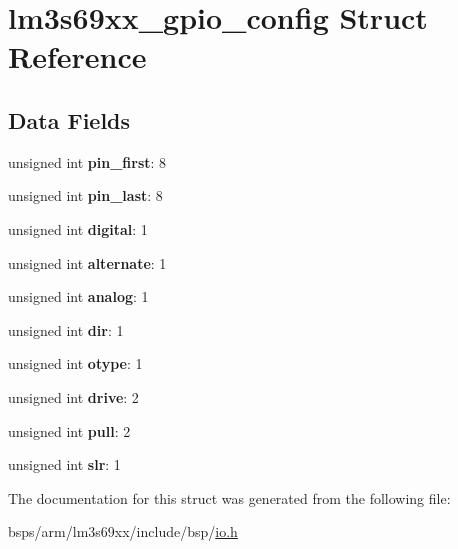 \hypertarget{structlm3s69xx__gpio__config}{}\section{lm3s69xx\+\_\+gpio\+\_\+config Struct Reference}
\label{structlm3s69xx__gpio__config}
\subsection*{Data Fields}
\begin{DoxyCompactItemize}
\item 
\mbox{\label{structlm3s69xx__gpio__config_a98771e4bac61cb4a7d56d781e24f86cb}} 
unsigned int {\bfseries pin\+\_\+first}\+: 8
\item 
\mbox{\label{structlm3s69xx__gpio__config_a06dcc57a59ce428246cb790e9d6d83dd}} 
unsigned int {\bfseries pin\+\_\+last}\+: 8
\item 
\mbox{\label{structlm3s69xx__gpio__config_aa6ac103c379f508c2f3e4422732e7377}} 
unsigned int {\bfseries digital}\+: 1
\item 
\mbox{\label{structlm3s69xx__gpio__config_a115f6aaaa24657106f63a46844c3335c}} 
unsigned int {\bfseries alternate}\+: 1
\item 
\mbox{\label{structlm3s69xx__gpio__config_a739c2908f99a9f26468d1d477e811090}} 
unsigned int {\bfseries analog}\+: 1
\item 
\mbox{\label{structlm3s69xx__gpio__config_aed62d8df8e69b0a15f5054228a2acf5b}} 
unsigned int {\bfseries dir}\+: 1
\item 
\mbox{\label{structlm3s69xx__gpio__config_a503f491a1b38d5f094bd0ba5931df52c}} 
unsigned int {\bfseries otype}\+: 1
\item 
\mbox{\label{structlm3s69xx__gpio__config_a4ce23a995b1018d499ea44f0b1d4008e}} 
unsigned int {\bfseries drive}\+: 2
\item 
\mbox{\label{structlm3s69xx__gpio__config_aad2e273c77be59cbd17e2ad2c57103f4}} 
unsigned int {\bfseries pull}\+: 2
\item 
\mbox{\label{structlm3s69xx__gpio__config_a4c59303c83352e260ec6111b322b41ea}} 
unsigned int {\bfseries slr}\+: 1
\end{DoxyCompactItemize}


The documentation for this struct was generated from the following file\+:\begin{DoxyCompactItemize}
\item 
bsps/arm/lm3s69xx/include/bsp/\mbox{\hyperlink{bsps_2arm_2lm3s69xx_2include_2bsp_2io_8h}{io.\+h}}\end{DoxyCompactItemize}
